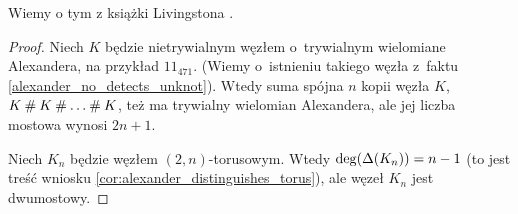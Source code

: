 Wiemy o tym z książki Livingstona \cite[s. 145]{livingston1993}.

\begin{proof}
    Niech $K$ będzie nietrywialnym węzłem o~trywialnym wielomiane Alexandera, na przykład $11_{471}$.
    (Wiemy o~istnieniu takiego węzła z~faktu \ref{alexander_no_detects_unknot}).
    Wtedy suma spójna $n$ kopii węzła $K$, $K \mathbin{\#} K \mathbin{\#} \ldots \mathbin{\#} K$, też ma trywialny wielomian Alexandera, ale jej liczba mostowa wynosi $2n + 1$.

    Niech $K_n$ będzie węzłem $(2, n)$-torusowym.
    Wtedy $\deg (\Delta(K_n)) = n-1$ (to jest treść wniosku \ref{cor:alexander_distinguishes_torus}), ale węzeł $K_n$ jest dwumostowy.
\end{proof}


